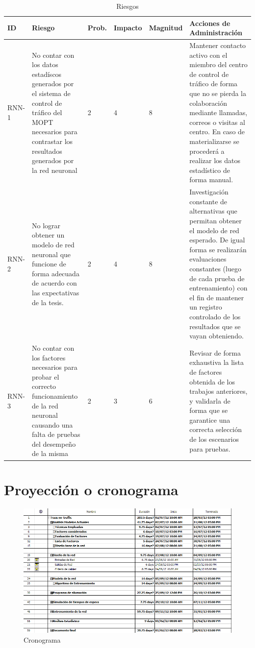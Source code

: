 	\begin{table}[!h]
			\centering
			\begin{tabular}{|p{1.3cm}|p{3cm}|p{1cm}|p{1.6cm}|p{1.8cm}|p{6cm}|}
				\hline
				\textbf{ID} & \textbf{Riesgo} & \textbf{Prob.} & \textbf{Impacto} & \textbf{Magnitud} & \textbf{Acciones de
				Administraci\'{o}n}\\ \hline 				
				RNN-1 & No contar con los datos estad\'{i}scos generados por el sistema de
				control de tr\'{a}fico del MOPT necesarios para contrastar los resultados
				generados por la red neuronal & 2 & 4 & 8 & Mantener contacto activo con
				el miembro del centro de control de tr\'{a}fico de forma que no se pierda
				la colaboraci\'{o}n mediante llamadas, correos o visitas al centro. En caso
				de materializarse se proceder\'{a} a realizar los datos estad\'{i}stico de
				forma manual.\\ 
				\hline 
				RNN-2 & No lograr obtener un modelo de red neuronal que funcione de forma
				adecuada de acuerdo con las expectativas de la tesis. & 2 & 4 & 8 &
				Investigaci\'{o}n constante de alternativas que permitan obtener el
				modelo de red esperado. De igual forma se realizar\'{a}n evaluaciones
				constantes (luego de cada prueba de entrenamiento) con el fin de mantener un
				registro controlado de los resultados que se vayan obteniendo. 
				\\ 
				\hline 						
				RNN-3 & No contar con los factores necesarios para probar el correcto
				funcionamiento de la red neuronal causando una falta de pruebas del
				desempe\~{n}o de la misma & 2 & 3 & 6 & Revisar de forma exhaustiva la lista
				de factores obtenida de los trabajos anteriores, y validarla de forma que se
				garantice una correcta selecci\'{o}n de los escenarios para pruebas.
				\\
				\hline	
				 
			\end{tabular}
			\caption{Riesgos}
			\label{tab:risk}
		\end{table}
		
	\section{Proyecci\'{o}n o cronograma}	
	\begin{figure}[htp]
 		\centering
 		\includegraphics[width=1.1\textwidth,
 		height=0.65\textheight]{images/cronoMIN.png}
 		\caption{Cronograma}
 		\label{fig:Crono}
 	\end{figure}
	
